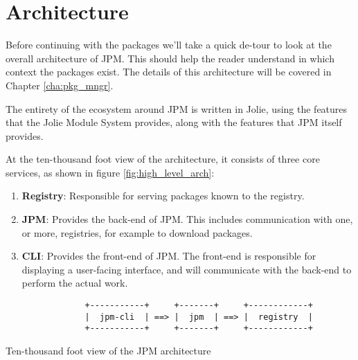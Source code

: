 \section{Architecture}
\label{sec:jpm_simple_arch}


Before continuing with the packages we'll take a quick de-tour to look at the
overall architecture of JPM. This should help the reader understand in which
context the packages exist. The details of this architecture will be covered in
Chapter \ref{cha:pkg_mngr}.

The entirety of the ecosystem around JPM is written in Jolie, using the
features that the Jolie Module System provides, along with the features that
JPM itself provides.

At the ten-thousand foot view of the architecture, it consists of three
core services, as shown in figure \ref{fig:high_level_arch}:

\begin{enumerate}

\item \textbf{Registry}: Responsible for serving packages known to the
registry.

\item \textbf{JPM}: Provides the back-end of JPM. This includes communication
with one, or more, registries, for example to download packages.

\item \textbf{CLI}: Provides the front-end of JPM. The front-end is responsible
for displaying a user-facing interface, and will communicate with the back-end
to perform the actual work.

\end{enumerate}

\begin{listing}[H]
\begin{verbatim}
                +-----------+     +-------+     +------------+
                |  jpm-cli  | ==> |  jpm  | ==> |  registry  |
                +-----------+     +-------+     +------------+
\end{verbatim}
\caption{Ten-thousand foot view of the JPM architecture}
\label{fig:high_level_arch}
\end{listing}

